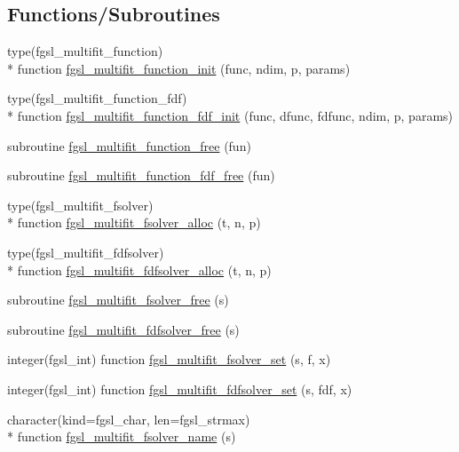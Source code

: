 \subsection*{Functions/\-Subroutines}
\begin{DoxyCompactItemize}
\item 
type(fgsl\-\_\-multifit\-\_\-function) \\*
function \hyperlink{multifit_8finc_a2e394cedc80d509b3d36075c158a5e0b}{fgsl\-\_\-multifit\-\_\-function\-\_\-init} (func, ndim, p, params)
\item 
type(fgsl\-\_\-multifit\-\_\-function\-\_\-fdf) \\*
function \hyperlink{multifit_8finc_a2dd878d64008fb31f3d9d031fd5996b7}{fgsl\-\_\-multifit\-\_\-function\-\_\-fdf\-\_\-init} (func, dfunc, fdfunc, ndim, p, params)
\item 
subroutine \hyperlink{multifit_8finc_a00bc267d2137d1f864bd2dad8cf9c1e4}{fgsl\-\_\-multifit\-\_\-function\-\_\-free} (fun)
\item 
subroutine \hyperlink{multifit_8finc_a268c4c5943960408672abc2e9688bf83}{fgsl\-\_\-multifit\-\_\-function\-\_\-fdf\-\_\-free} (fun)
\item 
type(fgsl\-\_\-multifit\-\_\-fsolver) \\*
function \hyperlink{multifit_8finc_ab65091d8504740c62c4e7524b9baf849}{fgsl\-\_\-multifit\-\_\-fsolver\-\_\-alloc} (t, n, p)
\item 
type(fgsl\-\_\-multifit\-\_\-fdfsolver) \\*
function \hyperlink{multifit_8finc_ad6618c0ee5bef46ed5dedb9a15061e4d}{fgsl\-\_\-multifit\-\_\-fdfsolver\-\_\-alloc} (t, n, p)
\item 
subroutine \hyperlink{multifit_8finc_a4edb3e095664b64c3d404361b85646b8}{fgsl\-\_\-multifit\-\_\-fsolver\-\_\-free} (s)
\item 
subroutine \hyperlink{multifit_8finc_a165ecb344b49316126c86c7b77736818}{fgsl\-\_\-multifit\-\_\-fdfsolver\-\_\-free} (s)
\item 
integer(fgsl\-\_\-int) function \hyperlink{multifit_8finc_add0161459835f3bb750e5f1b624a7431}{fgsl\-\_\-multifit\-\_\-fsolver\-\_\-set} (s, f, x)
\item 
integer(fgsl\-\_\-int) function \hyperlink{multifit_8finc_aeeaba728844c99084aa56a584dbd90d6}{fgsl\-\_\-multifit\-\_\-fdfsolver\-\_\-set} (s, fdf, x)
\item 
character(kind=fgsl\-\_\-char, len=fgsl\-\_\-strmax) \\*
function \hyperlink{multifit_8finc_a1c86f8b8187449338d57229da0c9c87a}{fgsl\-\_\-multifit\-\_\-fsolver\-\_\-name} (s)

\end{DoxyCompactItemize}
